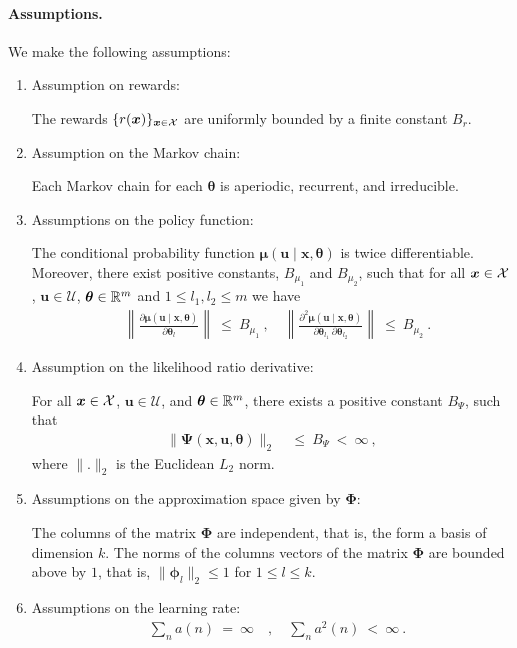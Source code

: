 \documentclass{article}
\newcommand\Bu{\bm{u}}
\newcommand\Bx{\bm{x}}
\newcommand\Bmu{\bm{\mu}}
\newcommand\Bth{\bm{\theta}}
\newcommand\Bph{\bm{\phi}}
\newcommand\BPh{\bm{\Phi}}
\newcommand\BPs{\bm{\Psi}}
\newcommand{\cU}{\mathcal{U}} \newcommand{\cV}{\mathcal{V}}
\renewcommand{\leq}{\leqslant}
\begin{document}
\paragraph{Assumptions.}
We make the following assumptions:
\begin{enumerate}[label=\textbf{(A\arabic*)}]
\item Assumption on rewards:

The rewards $\{ r(\Bx)\}_{\Bx \in \cX}$ are uniformly bounded by a
finite constant $B_r$.

\item Assumption on the Markov chain:

Each Markov chain for each $\Bth$ is aperiodic, recurrent, and
irreducible.

\item Assumptions on the policy function:

The conditional probability function $\Bmu(\Bu \mid \Bx, \Bth)$
is twice differentiable. Moreover, there exist positive constants,
$B_{\mu_1}$ and $B_{\mu_2}$, such that for all $\Bx \in \cX$,
$\Bu  \in \cU$, $\Bth \in \dR^m$ and $1 \leq l_1,l_2 \leq m$ we
have
\begin{align}
&\left\| \frac{\partial \Bmu(\Bu \mid \Bx, \Bth)}{\partial
  \Bth_l}\right\| \ \leq \ B_{\mu_1} \ , \quad
\left\| \frac{\partial^2 \Bmu(\Bu \mid \Bx, \Bth)}{\partial
  \Bth_{l_1} \ \partial \Bth_{l_2}}\right\| \ \leq \ B_{\mu_2} \ .
\end{align}

\item Assumption on the likelihood ratio derivative:

For all $\Bx \in \cX$,
$\Bu \in \cU$, and $\Bth \in \dR^m$, there exists a positive
constant $B_{\Psi}$, such that
\begin{align}
\| \BPs(\Bx,\Bu,\Bth) \|_2 \ &\leq \ B_{\Psi} \ < \ \infty \ ,
\end{align}
where $\| . \|_2$ is the Euclidean $L_2$ norm.

\item Assumptions on the approximation space given by $\BPh$:

The columns of the matrix $\BPh$ are independent, that is, the form a
basis of dimension $k$.
The norms of the columns vectors of the matrix $\BPh$ are bounded
above by $1$, that is, $\| \Bph_l \|_2 \leq 1$ for $1 \leq l \leq k$.

\item Assumptions on the learning rate:
\begin{align}
&\sum_{n} a(n) \ = \ \infty \quad , \quad
\sum_{n} a^2(n) \ < \ \infty \ .
\end{align}

\end{enumerate}
\end{document}
